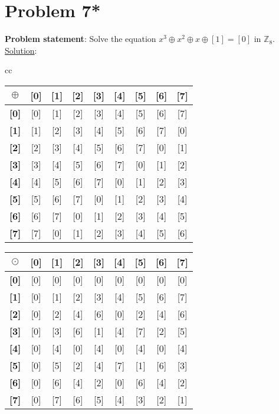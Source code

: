 \documentclass{article} %
\begin{document}
\newpage

\section*{Problem 7*}


\textbf{Problem statement}: Solve the equation $x^3 \oplus x^2 \oplus x \oplus [1] = [0]$ in $\mathbb{Z}_8$.
\\

\underline{Solution}: \\
\begin{tabular}{cc}
\begin{tabular}{|c|c|c|c|c|c|c|c|c|}
\hline
\textbf{$\oplus$}&\textbf{[0]}&\textbf{[1]}&\textbf{[2]}&\textbf{[3]}&\textbf{[4]}&\textbf{[5]}&\textbf{[6]}&\textbf{[7]}\\ \hline
\textbf{[0]} & [0] & [1] & [2] & [3] & [4] & [5] & [6] & [7]\\ \hline
\textbf{[1]} & [1] & [2] & [3] & [4] & [5] & [6] & [7] & [0]\\ \hline
\textbf{[2]} & [2] & [3] & [4] & [5] & [6] & [7] & [0] & [1]\\ \hline
\textbf{[3]} & [3] & [4] & [5] & [6] & [7] & [0] & [1] & [2]\\ \hline
\textbf{[4]} & [4] & [5] & [6] & [7] & [0] & [1] & [2] & [3]\\ \hline
\textbf{[5]} & [5] & [6] & [7] & [0] & [1] & [2] & [3] & [4]\\ \hline
\textbf{[6]} & [6] & [7] & [0] & [1] & [2] & [3] & [4] & [5]\\ \hline
\textbf{[7]} & [7] & [0] & [1] & [2] & [3] & [4] & [5] & [6]\\ \hline
\end{tabular}

\quad

\begin{tabular}{|c|c|c|c|c|c|c|c|c|}
\hline
\textbf{$\odot$}&\textbf{[0]}&\textbf{[1]}&\textbf{[2]}&\textbf{[3]}&\textbf{[4]}&\textbf{[5]}&\textbf{[6]}&\textbf{[7]}\\ \hline
\textbf{[0]} & [0] & [0] & [0] & [0] & [0] & [0] & [0] & [0]\\ \hline
\textbf{[1]} & [0] & [1] & [2] & [3] & [4] & [5] & [6] & [7]\\ \hline
\textbf{[2]} & [0] & [2] & [4] & [6] & [0] & [2] & [4] & [6]\\ \hline
\textbf{[3]} & [0] & [3] & [6] & [1] & [4] & [7] & [2] & [5]\\ \hline
\textbf{[4]} & [0] & [4] & [0] & [4] & [0] & [4] & [0] & [4]\\ \hline
\textbf{[5]} & [0] & [5] & [2] & [4] & [7] & [1] & [6] & [3]\\ \hline
\textbf{[6]} & [0] & [6] & [4] & [2] & [0] & [6] & [4] & [2]\\ \hline
\textbf{[7]} & [0] & [7] & [6] & [5] & [4] & [3] & [2] & [1]\\ \hline
\end{tabular}
\end{tabular}
\end{document}
